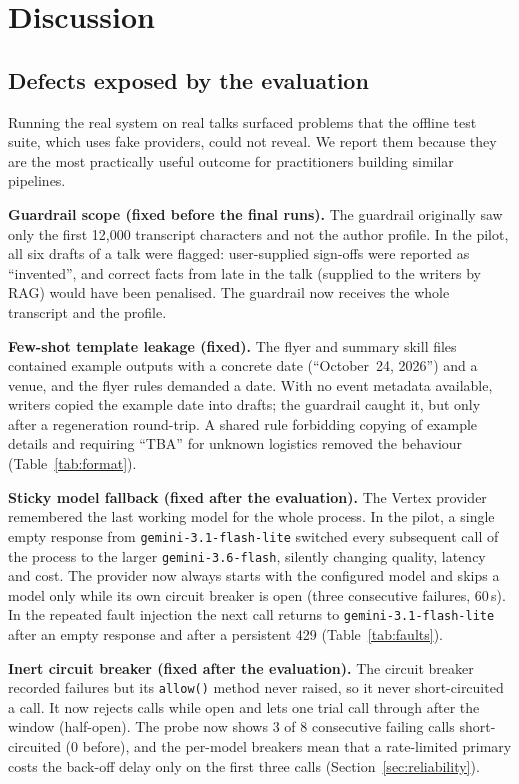 \section{Discussion}\label{sec:discussion}
\subsection{Defects exposed by the evaluation}
Running the real system on real talks surfaced problems that the offline test suite, which
uses fake providers, could not reveal. We report them because they are the most practically
useful outcome for practitioners building similar pipelines.

\textbf{Guardrail scope (fixed before the final runs).} The guardrail originally saw only
the first 12{,}000 transcript characters and not the author profile. In the pilot, all six
drafts of a talk were flagged: user-supplied sign-offs were reported as ``invented'', and
correct facts from late in the talk (supplied to the writers by RAG) would have been
penalised. The guardrail now receives the whole transcript and the profile.

\textbf{Few-shot template leakage (fixed).} The flyer and summary skill files contained
example outputs with a concrete date (``October~24, 2026'') and a venue, and the flyer rules
demanded a date. With no event metadata available, writers copied the example date into
drafts; the guardrail caught it, but only after a regeneration round-trip. A shared rule
forbidding copying of example details and requiring ``TBA'' for unknown logistics removed
the behaviour (Table~\ref{tab:format}).

\textbf{Sticky model fallback (fixed after the evaluation).} The Vertex provider remembered the
last working model for the whole process. In the pilot, a single empty response from
\texttt{gemini-3.1-flash-lite} switched every subsequent call of the process to the larger
\texttt{gemini-3.6-flash}, silently changing quality, latency and cost. The provider now always
starts with the configured model and skips a model only while its own circuit breaker is open
(three consecutive failures, 60\,s). In the repeated fault injection the next call returns to
\texttt{gemini-3.1-flash-lite} after an empty response and after a persistent 429
(Table~\ref{tab:faults}).

\textbf{Inert circuit breaker (fixed after the evaluation).} The circuit breaker recorded
failures but its \texttt{allow()} method never raised, so it never short-circuited a call. It
now rejects calls while open and lets one trial call through after the window (half-open).
The probe now shows 3 of 8 consecutive failing calls short-circuited (0 before), and the
per-model breakers mean that a rate-limited primary costs the back-off delay only on the first
three calls (Section~\ref{sec:reliability}).

